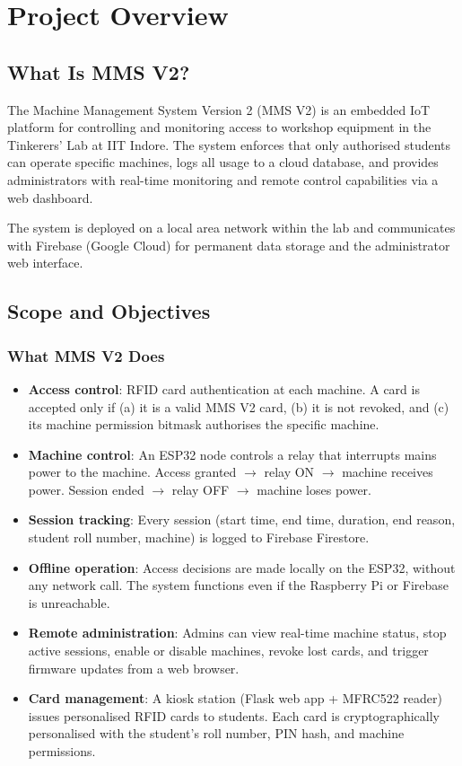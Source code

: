 \chapter{Project Overview}
\label{ch:overview}

\section{What Is MMS V2?}

The Machine Management System Version 2 (MMS V2) is an embedded IoT platform for controlling and monitoring access to workshop equipment in the Tinkerers' Lab at IIT Indore. The system enforces that only authorised students can operate specific machines, logs all usage to a cloud database, and provides administrators with real-time monitoring and remote control capabilities via a web dashboard.

The system is deployed on a local area network within the lab and communicates with Firebase (Google Cloud) for permanent data storage and the administrator web interface.

\section{Scope and Objectives}

\subsection{What MMS V2 Does}

\begin{itemize}[leftmargin=1.5em]
    \item \textbf{Access control}: RFID card authentication at each machine. A card is accepted only if (a) it is a valid MMS V2 card, (b) it is not revoked, and (c) its machine permission bitmask authorises the specific machine.
    \item \textbf{Machine control}: An ESP32 node controls a relay that interrupts mains power to the machine. Access granted $\rightarrow$ relay ON $\rightarrow$ machine receives power. Session ended $\rightarrow$ relay OFF $\rightarrow$ machine loses power.
    \item \textbf{Session tracking}: Every session (start time, end time, duration, end reason, student roll number, machine) is logged to Firebase Firestore.
    \item \textbf{Offline operation}: Access decisions are made locally on the ESP32, without any network call. The system functions even if the Raspberry Pi or Firebase is unreachable.
    \item \textbf{Remote administration}: Admins can view real-time machine status, stop active sessions, enable or disable machines, revoke lost cards, and trigger firmware updates from a web browser.
    \item \textbf{Card management}: A kiosk station (Flask web app + MFRC522 reader) issues personalised RFID cards to students. Each card is cryptographically personalised with the student's roll number, PIN hash, and machine permissions.
\end{itemize}

